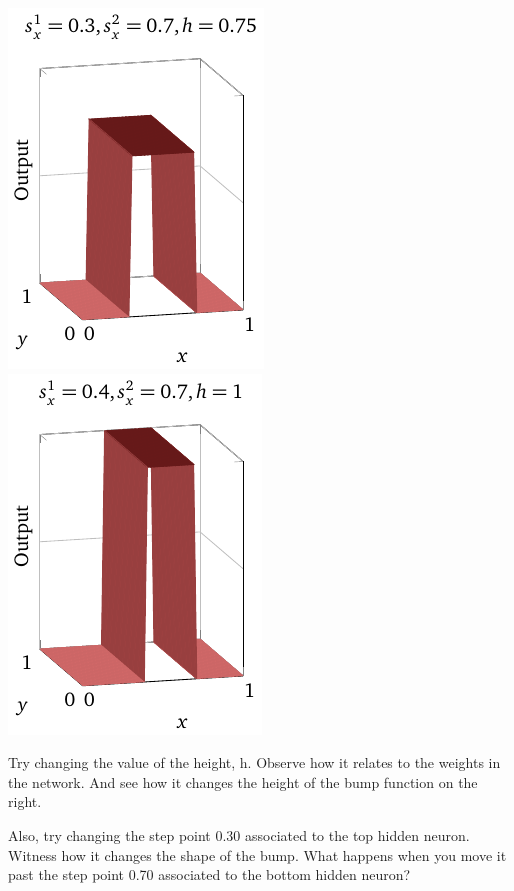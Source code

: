 \documentclass[a4paper,twoside,10pt]{book}
\begin{document}
\begin{center}
	\includegraphics[width=0.32\linewidth]{./figures/ch4/3d/bumpx2}
	\includegraphics[width=0.32\linewidth]{./figures/ch4/3d/bumpx3}
\end{center}
%
%
Try changing the value of the height, h. Observe how it relates to the weights in the network. And see how it changes the height of the bump function on the right.

Also, try changing the step point 0.30 associated to the top hidden neuron. Witness how it changes the shape of the bump. What happens when you move it past the step point 0.70 associated to the bottom hidden neuron?
\end{document}
